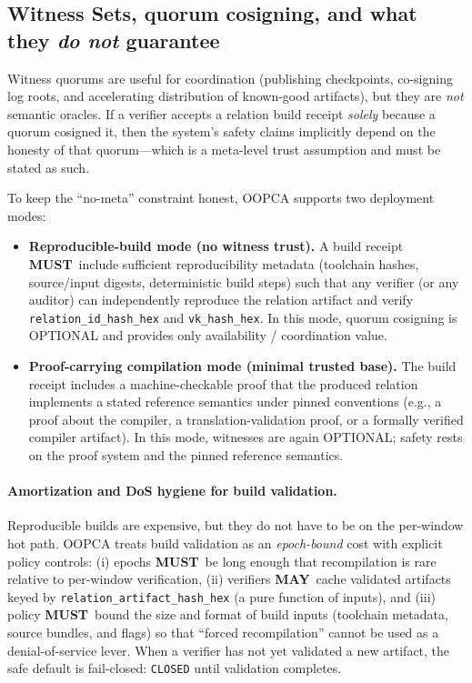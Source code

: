 \documentclass[11pt]{article}
\newcommand{\MUST}{\textbf{MUST}}
\newcommand{\MAY}{\textbf{MAY}}
\begin{document}
\subsection{Witness Sets, quorum cosigning, and what they \emph{do not} guarantee}

Witness quorums are useful for coordination (publishing checkpoints, co-signing log roots, and accelerating distribution of known-good artifacts), but they are \emph{not} semantic oracles.
If a verifier accepts a relation build receipt \emph{solely} because a quorum cosigned it, then the system's safety claims implicitly depend on the honesty of that quorum---which is a meta-level trust assumption and must be stated as such.

To keep the ``no-meta'' constraint honest, OOPCA supports two deployment modes:

\begin{itemize}[leftmargin=1.2em]
  \item \textbf{Reproducible-build mode (no witness trust).}
  A build receipt \MUST\ include sufficient reproducibility metadata (toolchain hashes, source/input digests, deterministic build steps) such that any verifier (or any auditor) can independently reproduce the relation artifact and verify \texttt{relation\_id\_hash\_hex} and \texttt{vk\_hash\_hex}.
  In this mode, quorum cosigning is OPTIONAL and provides only availability / coordination value.
  \item \textbf{Proof-carrying compilation mode (minimal trusted base).}
  The build receipt includes a machine-checkable proof that the produced relation implements a stated reference semantics under pinned conventions (e.g., a proof about the compiler, a translation-validation proof, or a formally verified compiler artifact).
  In this mode, witnesses are again OPTIONAL; safety rests on the proof system and the pinned reference semantics.
\end{itemize}

\paragraph{Amortization and DoS hygiene for build validation.}
Reproducible builds are expensive, but they do not have to be on the per-window hot path.
OOPCA treats build validation as an \emph{epoch-bound} cost with explicit policy controls:
(i) epochs \MUST\ be long enough that recompilation is rare relative to per-window verification,
(ii) verifiers \MAY\ cache validated artifacts keyed by \texttt{relation\_artifact\_hash\_hex} (a pure function of inputs), and
(iii) policy \MUST\ bound the size and format of build inputs (toolchain metadata, source bundles, and flags) so that ``forced recompilation'' cannot be used as a denial-of-service lever.
When a verifier has not yet validated a new artifact, the safe default is fail-closed: \texttt{CLOSED} until validation completes.
\end{document}
